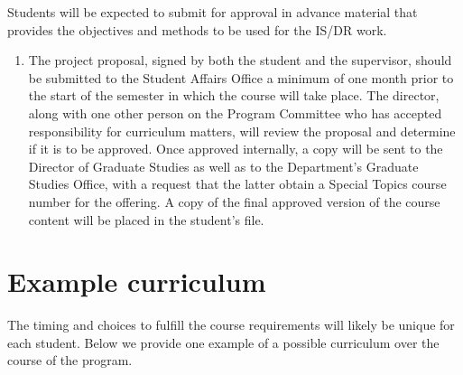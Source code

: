 \documentclass[
]{book}
\providecommand{\tightlist}{%
  \setlength{\itemsep}{0pt}\setlength{\parskip}{0pt}}
\begin{document}
Students will be expected to submit for approval in advance material that provides the objectives and methods to be used for the IS/DR work.

\begin{enumerate}
\def\labelenumi{\arabic{enumi}.}
\setcounter{enumi}{2}
\tightlist
\item
  The project proposal, signed by both the student and the supervisor, should be submitted to the Student Affairs Office a minimum of one month prior to the start of the semester in which the course will take place. The director, along with one other person on the Program Committee who has accepted responsibility for curriculum matters, will review the proposal and determine if it is to be approved. Once approved internally, a copy will be sent to the Director of Graduate Studies as well as to the Department's Graduate Studies Office, with a request that the latter obtain a Special Topics course number for the offering. A copy of the final approved version of the course content will be placed in the student's file.
\end{enumerate}

\hypertarget{example-curriculum}{%
\section{Example curriculum}\label{example-curriculum}}

The timing and choices to fulfill the course requirements will likely be unique for each student. Below we provide one example of a possible curriculum over the course of the program.
\end{document}
